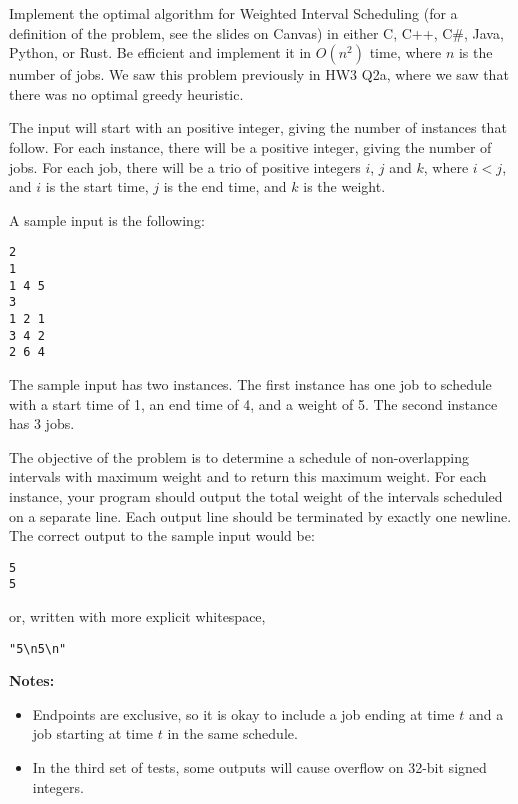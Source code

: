 \documentclass[solutionorbox,answers]{exam}
\begin{document}
\begin{questions}

\newpage

\question

Implement the optimal algorithm for Weighted Interval Scheduling (for a definition of the problem, see the slides on Canvas) in either C, C++, C\#, Java, Python, or Rust. Be efficient and implement it in $O(n^2)$ time, where $n$ is the number of jobs. We saw this problem previously in HW3 Q2a, where we saw that there was no optimal greedy heuristic.

The input will start with an positive integer, giving the number of instances that follow. For each instance, there will be a positive integer, giving the number of jobs. For each job, there will be a trio of positive integers $i$, $j$ and $k$, where $i < j$, and $i$ is the start time, $j$ is the end time, and $k$ is the weight.

A sample input is the following:
\begin{verbatim}
2
1
1 4 5
3
1 2 1
3 4 2
2 6 4
\end{verbatim}
The sample input has two instances. The first instance has one job to schedule with a start time of 1, an end time of 4, and a weight of 5. The second instance has 3 jobs.

The objective of the problem is to determine a schedule of non-overlapping intervals with maximum weight and to return this maximum weight. For each instance, your program should output the total weight of the intervals scheduled on a separate line. Each output line should be terminated by exactly one newline. The correct output to the sample input would be:
\begin{verbatim}
5
5
\end{verbatim}
or, written with more explicit whitespace,
\begin{verbatim}
"5\n5\n"
\end{verbatim}
\textbf{Notes:}
\begin{itemize}
  \item Endpoints are exclusive, so it is okay to include a job ending at time $t$ and a job starting at time $t$ in the same schedule.
  \item In the third set of tests, some outputs will cause overflow on 32-bit signed integers.
\end{itemize}

\end{questions}
\end{document}

